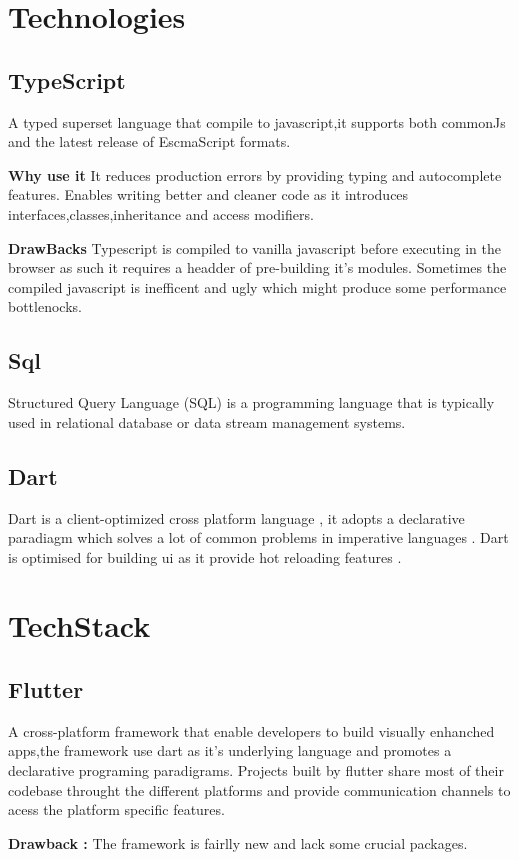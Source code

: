 \documentclass{article}
\begin{document}
\section{Technologies}
\subsection{TypeScript}
A typed superset language that compile to javascript,it supports both commonJs and the latest release of EscmaScript formats.

\textbf{Why use it}
It reduces production errors by providing typing and autocomplete features.
Enables writing better and cleaner code as it introduces interfaces,classes,inheritance and access modifiers.

\textbf{DrawBacks}
Typescript is compiled to vanilla javascript before executing in the browser as such it requires a headder of pre-building it's modules.
Sometimes the compiled javascript is inefficent and ugly which might produce some performance bottlenocks.

\subsection{Sql}
Structured Query Language (SQL) is a programming language that is typically used in relational database or data stream management systems.
\subsection{Dart}
Dart is a client-optimized cross platform language , it adopts a declarative paradiagm which solves a lot of common problems in imperative languages . Dart is optimised for building ui as it provide hot reloading features . 
\section{TechStack}
\subsection{Flutter}
A cross-platform framework that enable developers to build visually enhanched apps,the framework use dart as it's underlying language and promotes a declarative programing paradigrams.
Projects built by flutter share most of their codebase throught the different platforms and provide communication channels to acess the platform specific  
features.

\textbf{Drawback : }
The framework is fairlly new and lack some crucial packages.
\end{document}
